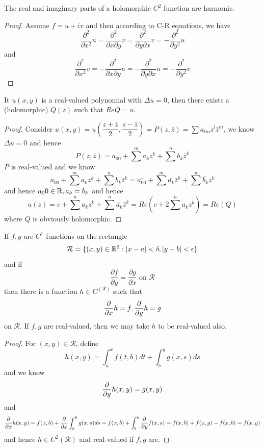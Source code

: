 \begin{proposition}
    The real and imaginary parts of a holomorphic $C^2$ function are harmonic.
\end{proposition}
\begin{proof}\par
    Assume $f = u + iv$ and then according to C-R equations, we have
    \[\dfrac{\partial^2}{\partial x^2} u = \dfrac{\partial^2}{\partial x\partial y} v = \dfrac{\partial^2}{\partial y\partial x} v = -\dfrac{\partial^2}{\partial y^2} u
    \]
    and
    \[\dfrac{\partial^2}{\partial x^2} v = -\dfrac{\partial^2}{\partial x\partial y} u = -\dfrac{\partial^2}{\partial y\partial x} u = -\dfrac{\partial^2}{\partial y^2} v
    \]
\end{proof}

\begin{lemma}
It $u(x,y)$ is a real-valued polynomial with $\Delta u = 0$, then there exists a (holomorphic) $Q(z)$ such that $Re Q= u$.
\end{lemma}
\begin{proof}\par
    Consider $u(x,y) = u(\dfrac{z+\bar{z}}{2},\dfrac{z-\bar{z}}{2}) = P(z,\bar{z}) = \sum a_{lm}z^l\bar{z}^m$, we know $\Delta u = 0$ and hence
    \[P(z,\bar{z}) = a_00 + \sum^m a_k z^k + \sum^n b_k \bar{z}^k\]
    $P$ is real-valued and we know
    \[a_00 + \sum^m a_k z^k + \sum^n b_k \bar{z}^k = \bar{a_00} + \sum^m \bar{a_k} \bar{z}^k + \sum^n \bar{b_k} z^k\]
    and hence $a_00\in \mathbb{R}, a_k = \bar{b_k}$ and hence
    \[
    u(z) = c + \sum^n a_{k}z^k + \sum^n \bar{a_{k}}\bar{z}^k = Re(c+2\sum^n a_k z^k) = Re(Q)
    \]
    where $Q$ is obviously holomorphic.
\end{proof}

\begin{theorem}
    If $f,g$ are $C^1$ functions on the rectangle
    \[\mathcal{R} = \{(x,y)\in \mathbb{R}^2: |x-a|<\delta, |y-b|<\epsilon\}\]
    and if 
    \[
    \dfrac{\partial f}{\partial y} = \dfrac{\partial g}{\partial x}\text{ on }\mathcal{R}
    \]
    then there is a function $h\in C^(\mathcal{R})$ such that
    \[\dfrac{\partial}{\partial x} h =f, \dfrac{\partial}{\partial y} h = g\]
    on $\mathcal{R}$. If $f,g$ are real-valued, then we may take $h$ to be real-valued also.
\end{theorem}
\begin{proof}\par
    For $(x,y) \in \mathcal{R}$, define
    \[h(x,y) = \int_a^x f(t,b) dt + \int_b^y g(x,s)ds\]
    and we know
    \[
    \dfrac{\partial}{\partial y} h(x,y) = g(x,y)
    \]
    and 
    \[\dfrac{\partial}{\partial x} h(x,y) = f(x,b) + \dfrac{\partial}{\partial x} \int_b^y g(x,s) ds = f(x,b) + \int_b^y \dfrac{\partial}{\partial y} f(x,s) = f(x,b) + f(x,y)-f(x,b) = f(x,y)\]
    and hence $h \in C^2(\mathcal{R})$ and real-valued if $f,g$ are.
\end{proof}

